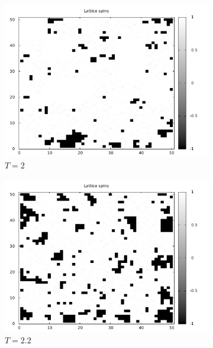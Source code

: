 \documentclass[]{article}
\begin{document}
\begin{figure}[ht!]
 \centering
 \begin{subfigure}[b]{0.3\linewidth}
  \includegraphics[width=\textwidth]{figures/spin_T_eq_2.pdf}
  \caption{$T=2$}
  \label{fig:spin_t_eq_2}
 \end{subfigure}
 \begin{subfigure}[b]{0.3\linewidth}
  \includegraphics[width=\textwidth]{figures/spin_T_eq_2p2.pdf}
  \caption{$T=2.2$}
  \label{fig:spin_t_eq_2p2}
 \end{subfigure}
 \begin{subfigure}[b]{0.3\linewidth}

\end{subfigure}
\end{figure}
\end{document}
